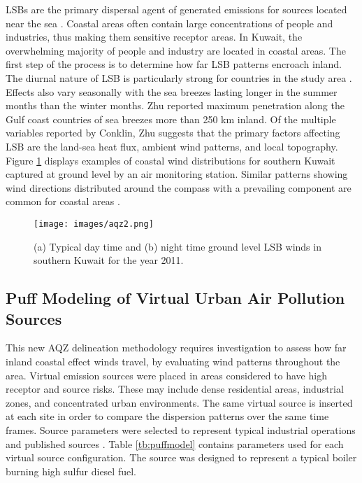 LSBs are the primary dispersal agent of generated emissions for sources located near the sea \citep{Cuxart2014}.  Coastal areas often contain large concentrations of people and industries, thus making them sensitive receptor areas.  In Kuwait, the overwhelming majority of people and industry are located in coastal areas.  The first step of the process is to determine how far LSB patterns encroach inland.  The diurnal nature of LSB is particularly strong for countries in the study area \citep{Zhu2004}.  Effects also vary seasonally with the sea breezes lasting longer in the summer months than the winter months.  Zhu reported maximum penetration along the Gulf coast countries of sea breezes more than 250 km inland.  Of the multiple variables reported by Conklin, Zhu suggests that the primary factors affecting LSB are the land-sea heat flux, ambient wind patterns, and local topography.  Figure \ref{fig:LSBwinds} displays examples of coastal wind distributions for southern Kuwait captured at ground level by an air monitoring station.  Similar patterns showing wind directions distributed around the compass with a prevailing component are common for coastal areas \citep{Lozano2013}.

%
\begin{figure}[H]
\texttt{[image: images/aqz2.png]} 
\caption[Typical LSB winds for Kuwait]{(a) Typical day time and (b) night time ground level LSB winds in southern Kuwait for the year 2011.}
\label{fig:LSBwinds}
\end{figure}
% 
\subsection{Puff Modeling of Virtual Urban Air Pollution Sources}

This new AQZ delineation methodology requires investigation to assess how far inland coastal effect winds travel, by evaluating wind patterns throughout the area.  Virtual emission sources were placed in areas considered to have high receptor and source risks.  These may include dense residential areas, industrial zones, and concentrated urban environments.  The same virtual source is inserted at each site in order to compare the dispersion patterns over the same time frames. Source parameters were selected to represent typical industrial operations and published sources \citep{Chusai2012}. Table \ref{tb:puffmodel} contains parameters used for each virtual source configuration.  The source was designed to represent a typical boiler burning high sulfur diesel fuel.


